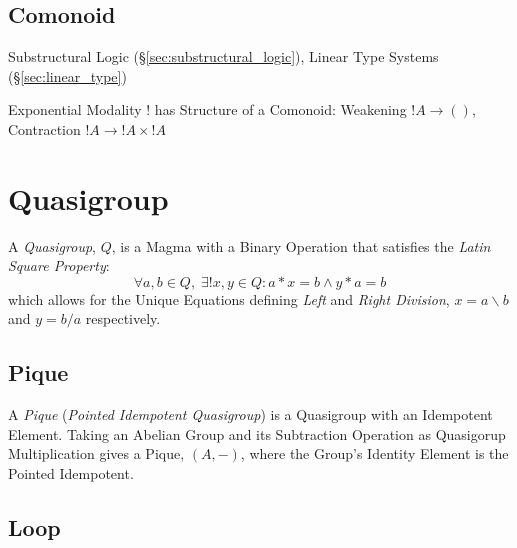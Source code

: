 \subsection{Comonoid}\label{sec:comonoid}

Substructural Logic (\S\ref{sec:substructural_logic}), Linear Type
Systems (\S\ref{sec:linear_type})

Exponential Modality $!$ has Structure of a Comonoid: Weakening $!A
\rightarrow ()$, Contraction $!A \rightarrow !A \times !A$



\section{Quasigroup}\label{sec:quasigroup}

A \emph{Quasigroup}, $Q$, is a Magma with a Binary Operation that satisfies
the \emph{Latin Square Property}:
\[
  \forall a, b \in Q,\;\exists ! x,y \in Q : a * x = b \wedge y * a = b
\]
which allows for the Unique Equations defining \emph{Left} and
\emph{Right Division}, $x = a \backslash b$ and $y = b / a$
respectively.



\subsection{Pique}\label{sec:pique}

A \emph{Pique} (\emph{Pointed Idempotent Quasigroup}) is a Quasigroup
with an Idempotent Element. Taking an Abelian Group and its
Subtraction Operation as Quasigorup Multiplication gives a Pique,
$(A,-)$, where the Group's Identity Element is the Pointed Idempotent.



\subsection{Loop}\label{sec:quasigroup_loop}

